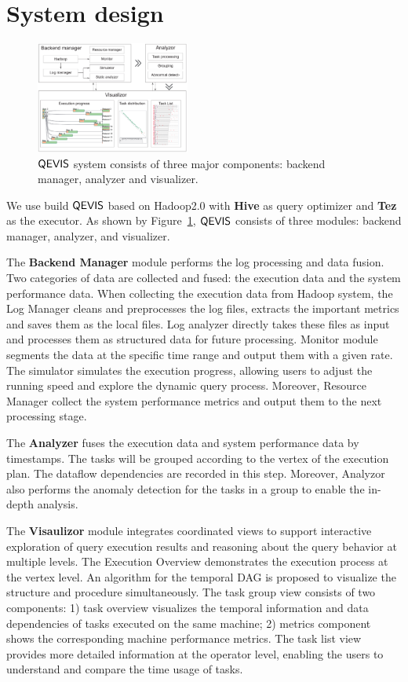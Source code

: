 \section{System design}
\begin{figure}[t]
	\centering
	\includegraphics[width=0.45\textwidth]{figures/system/sysdesign.pdf}
	\vspace{-3mm}
	\caption{$\mathsf{QEVIS}$ system consists of three major components: backend manager, analyzer and visualizer.}
	\label{fig:sysdesign}
	\vspace{-3mm}
\end{figure}
We use build $\mathsf{QEVIS}$ based on Hadoop2.0 with \textbf{Hive} as query optimizer and \textbf{Tez} as the executor. As shown by Figure~\ref{fig:sysdesign}, $\mathsf{QEVIS}$ consists of three modules: backend manager, analyzer, and visualizer. 


The \textbf{Backend Manager} module performs the log processing and data fusion. Two categories of data are collected and fused: the execution data and the system performance data.
When collecting the execution data from Hadoop system, the Log Manager cleans and preprocesses the log files, extracts the important metrics and saves them as the local files.
Log analyzer directly takes these files as input and processes them as structured data for future processing.
Monitor module segments the data at the specific time range and output them with a given rate.
The simulator simulates the execution progress, allowing users to adjust the running speed and explore the dynamic query process.
Moreover, Resource Manager collect the system performance metrics and output them to the next processing stage.


The \textbf{Analyzer} fuses the execution data and system performance data by timestamps. The tasks will be grouped according to the vertex of the execution plan. The dataflow dependencies are recorded in this step. Moreover, Analyzor also performs the anomaly detection for the tasks in a group to enable the in-depth analysis.


The \textbf{Visaulizor} module integrates coordinated views to support interactive exploration of query execution results and reasoning about the query behavior at multiple levels. The Execution Overview demonstrates the execution process at the vertex level. An algorithm for the temporal DAG is proposed to visualize the structure and procedure simultaneously. The task group view consists of two components: 1) task overview visualizes the temporal information and data dependencies of tasks executed on the same machine; 2) metrics component shows the corresponding machine performance metrics. The task list view provides more detailed information at the operator level, enabling the users to understand and compare the time usage of tasks. 

